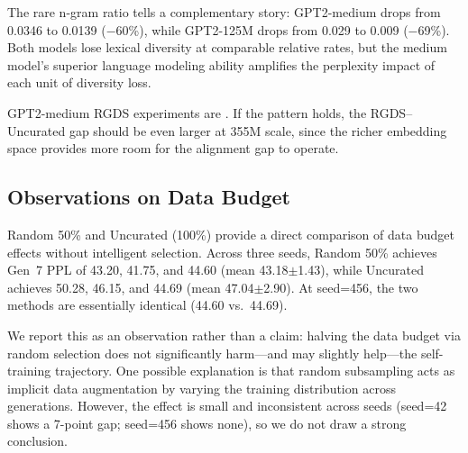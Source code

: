 The rare n-gram ratio tells a complementary story: GPT2-medium drops from 0.0346 to 0.0139 ($-$60\%), while GPT2-125M drops from 0.029 to 0.009 ($-$69\%). Both models lose lexical diversity at comparable relative rates, but the medium model's superior language modeling ability amplifies the perplexity impact of each unit of diversity loss.

GPT2-medium RGDS experiments are . If the pattern holds, the RGDS--Uncurated gap should be even larger at 355M scale, since the richer embedding space provides more room for the alignment gap to operate.

\subsection{Observations on Data Budget}
\label{sec:budget}

Random 50\% and Uncurated (100\%) provide a direct comparison of data budget effects without intelligent selection. Across three seeds, Random 50\% achieves Gen~7 PPL of 43.20, 41.75, and 44.60 (mean 43.18$\pm$1.43), while Uncurated achieves 50.28, 46.15, and 44.69 (mean 47.04$\pm$2.90). At seed=456, the two methods are essentially identical (44.60 vs.\ 44.69).

We report this as an observation rather than a claim: halving the data budget via random selection does not significantly harm---and may slightly help---the self-training trajectory. One possible explanation is that random subsampling acts as implicit data augmentation by varying the training distribution across generations. However, the effect is small and inconsistent across seeds (seed=42 shows a 7-point gap; seed=456 shows none), so we do not draw a strong conclusion.
